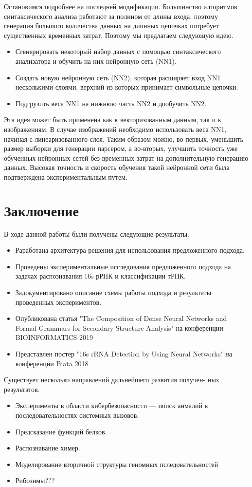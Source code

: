 \documentclass[14pt]{matmex-diploma-custom}
\begin{document}
Остановимся подробнее на последней модификации. Большинство алгоритмов синтаксического анализа работают за полином от длины входа, поэтому генерация большого количества данных на длинных цепочках потребует существенных временных затрат. Поэтому мы предлагаем следующую идею.
\begin{itemize}
    \item Сгенерировать некоторый набор данных с помощью синтаксического анализатора и обучить на них нейронную сеть (NN1).
    \item Создать новую нейронную сеть (NN2), которая расширяет вход NN1 несколькими слоями, верхний из которых принимает символьные цепочки.
    \item Подгрузить веса NN1 на нижнюю часть NN2 и дообучить NN2.
\end{itemize}

Эта идея может быть применена как к векторизованным данным, так и к изображениям. В случае изображений необходимо использовать веса NN1, начиная с линеаризованного слоя. Таким образом можно, во-первых, уменьшить размер выборки для генерации парсером, а во-вторых, улучшить точность уже обученных нейронных сетей без временных затрат на дополнительную генерацию данных. Высокая точность и скорость обучения такой нейронной сети была подтверждена экспериментальным путем. 

\section*{Заключение}
В ходе данной работы были получены следующие результаты.
\begin{itemize}
    \item Раработана архитектура решения для использования предложенного подхода.
    \item Проведены экспериментальные исследования предложенного подхода на задачах распознавания 16s рРНК и классификации тРНК.
    \item Задокументировано описание схемы работы подхода и результаты проведенных экспериментов.
    \item Опубликована статья "The Composition of Dense Neural Networks and Formal Grammars for Secondary Structure Analysis" на конференции BIOINFORMATICS 2019
    \item Представлен постер "16s rRNA Detection by Using Neural Networks" на конференции Biata 2018
\end{itemize}

Существует несколько направлений дальнейшего развития получен-
ных результатов.
\begin{itemize}
    \item Эксперименты в области кибербезопасности --- поиск анмалий в последовательностях системных вызовов.
    \item Предсказание функций белков.
    \item Распознавание химер.
    \item Моделирование вторичной структуры геномных пследовательностей
    \item Рибозимы???
\end{itemize}



\setmonofont[Mapping=tex-text]{CMU Typewriter Text}

\renewcommand\refname{Список литературы}

\end{document}
